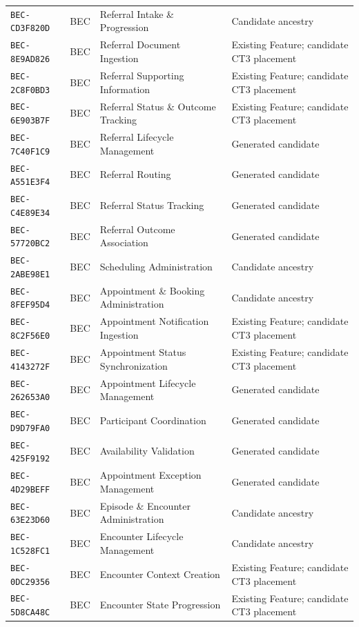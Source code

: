 \documentclass[11pt,a4paper,openany]{book}
\begin{document}
\begin{longtable}{@{}p{.19\linewidth}p{.12\linewidth}p{.39\linewidth}p{.24\linewidth}@{}}
\texttt{BEC-CD3F820D} & BEC & Referral Intake \& Progression & Candidate ancestry \\
\texttt{BEC-8E9AD826} & BEC & Referral Document Ingestion & Existing Feature; candidate CT3 placement \\
\texttt{BEC-2C8F0BD3} & BEC & Referral Supporting Information & Existing Feature; candidate CT3 placement \\
\texttt{BEC-6E903B7F} & BEC & Referral Status \& Outcome Tracking & Existing Feature; candidate CT3 placement \\
\texttt{BEC-7C40F1C9} & BEC & Referral Lifecycle Management & Generated candidate \\
\texttt{BEC-A551E3F4} & BEC & Referral Routing & Generated candidate \\
\texttt{BEC-C4E89E34} & BEC & Referral Status Tracking & Generated candidate \\
\texttt{BEC-57720BC2} & BEC & Referral Outcome Association & Generated candidate \\
\texttt{BEC-2ABE98E1} & BEC & Scheduling Administration & Candidate ancestry \\
\texttt{BEC-8FEF95D4} & BEC & Appointment \& Booking Administration & Candidate ancestry \\
\texttt{BEC-8C2F56E0} & BEC & Appointment Notification Ingestion & Existing Feature; candidate CT3 placement \\
\texttt{BEC-4143272F} & BEC & Appointment Status Synchronization & Existing Feature; candidate CT3 placement \\
\texttt{BEC-262653A0} & BEC & Appointment Lifecycle Management & Generated candidate \\
\texttt{BEC-D9D79FA0} & BEC & Participant Coordination & Generated candidate \\
\texttt{BEC-425F9192} & BEC & Availability Validation & Generated candidate \\
\texttt{BEC-4D29BEFF} & BEC & Appointment Exception Management & Generated candidate \\
\texttt{BEC-63E23D60} & BEC & Episode \& Encounter Administration & Candidate ancestry \\
\texttt{BEC-1C528FC1} & BEC & Encounter Lifecycle Management & Candidate ancestry \\
\texttt{BEC-0DC29356} & BEC & Encounter Context Creation & Existing Feature; candidate CT3 placement \\
\texttt{BEC-5D8CA48C} & BEC & Encounter State Progression & Existing Feature; candidate CT3 placement \\

\end{longtable}
\end{document}
